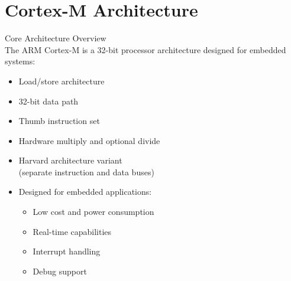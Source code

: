 \section{Cortex-M Architecture}

\begin{concept}{Core Architecture Overview}\\
The ARM Cortex-M is a 32-bit processor architecture designed for embedded systems:
\begin{itemize}
  \item Load/store architecture
  \item 32-bit data path
  \item Thumb instruction set
  \item Hardware multiply and optional divide
  \item Harvard architecture variant \\(separate instruction and data buses)
  \item Designed for embedded applications:
    \begin{itemize}
      \item Low cost and power consumption
      \item Real-time capabilities
      \item Interrupt handling
      \item Debug support
    \end{itemize}
\end{itemize}
\end{concept}


